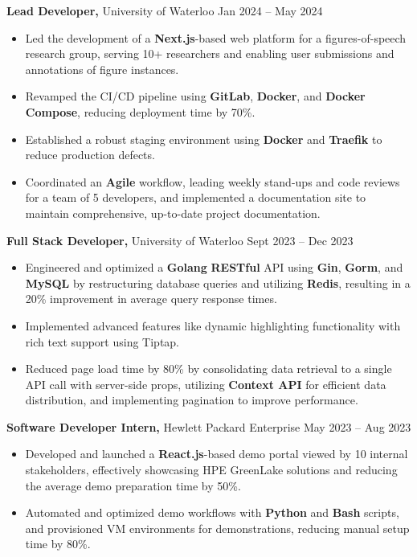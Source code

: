\textbf{Lead Developer,} {University of Waterloo}  \hfill Jan 2024 -- May 2024 \\
\vspace{-9pt}
\begin{itemize}
  \item Led the development of a \textbf{Next.js}-based web platform for a figures-of-speech research group, serving 10+ researchers and enabling user submissions and annotations of figure instances.
  \item Revamped the CI/CD pipeline using \textbf{GitLab}, \textbf{Docker}, and \textbf{Docker Compose}, reducing deployment time by 70\%.
  \item Established a robust staging environment using \textbf{Docker} and \textbf{Traefik} to reduce production defects. 
  \item Coordinated an \textbf{Agile} workflow, leading weekly stand-ups and code reviews for a team of 5 developers, and implemented a documentation site to maintain comprehensive, up-to-date project documentation.
\end{itemize}

\textbf{Full Stack Developer,} {University of Waterloo}  \hfill Sept 2023 -- Dec 2023 \\
\vspace{-9pt}
\begin{itemize}
  \item Engineered and optimized a \textbf{Golang} \textbf{RESTful} API using \textbf{Gin}, \textbf{Gorm}, and \textbf{MySQL} by restructuring database queries and utilizing \textbf{Redis}, resulting in a 20\% improvement in average query response times.
  \item Implemented advanced features like dynamic highlighting functionality with rich text support using Tiptap.
  \item Reduced page load time by 80\% by consolidating data retrieval to a single API call with server-side props, utilizing \textbf{Context API} for efficient data distribution, and implementing pagination to improve performance.
\end{itemize}

\textbf{Software Developer Intern,} {Hewlett Packard Enterprise}  \hfill May 2023 -- Aug 2023 \\
\vspace{-9pt}
\begin{itemize}
  \item Developed and launched a \textbf{React.js}-based demo portal viewed by 10 internal stakeholders, effectively showcasing HPE GreenLake solutions and reducing the average demo preparation time by 50\%.
  \item Automated and optimized demo workflows with \textbf{Python} and \textbf{Bash} scripts, and provisioned VM environments for demonstrations, reducing manual setup time by 80\%.
\end{itemize}

